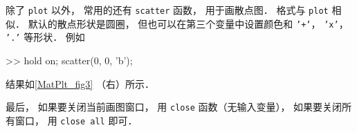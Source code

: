除了 \texttt{plot} 以外， 常用的还有 \texttt{scatter} 函数， 用于画散点图． 格式与 \texttt{plot} 相似． 默认的散点形状是圆圈， 但也可以在第三个变量中设置颜色和 \texttt{'+'}， \texttt{'x'}， \texttt{'.'} 等形状． 例如
\begin{Command}
>> hold on; scatter(0, 0, 'b');
\end{Command}
结果如\autoref{MatPlt_fig3} （右）所示．

最后， 如果要关闭当前画图窗口， 用 \texttt{close} 函数（无输入变量）， 如果要关闭所有窗口， 用 \texttt{close all} 即可．